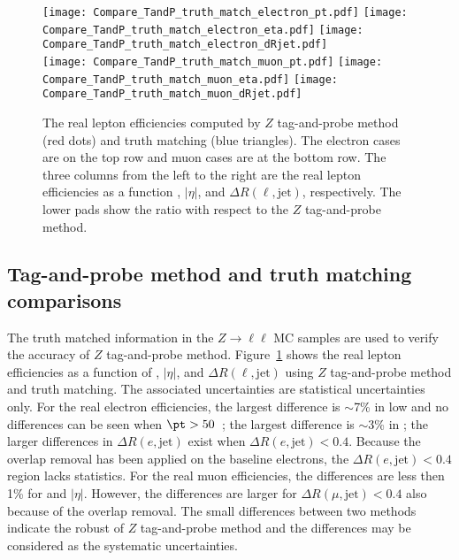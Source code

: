 \begin{figure}[htb]
    \texttt{[image: Compare\_TandP\_truth\_match\_electron\_pt.pdf]}
    \texttt{[image: Compare\_TandP\_truth\_match\_electron\_eta.pdf]}
    \texttt{[image: Compare\_TandP\_truth\_match\_electron\_dRjet.pdf]}\\
    \texttt{[image: Compare\_TandP\_truth\_match\_muon\_pt.pdf]}
    \texttt{[image: Compare\_TandP\_truth\_match\_muon\_eta.pdf]}
    \texttt{[image: Compare\_TandP\_truth\_match\_muon\_dRjet.pdf]}
    \caption{The real lepton efficiencies computed by $Z$ tag-and-probe method (red dots) and truth matching (blue triangles).
    The electron cases are on the top row and muon cases are at the bottom row.
    The three columns from the left to the right are the real lepton efficiencies as a function \pt, $|\eta|$, and $\Delta R(\ell, \mathrm{jet})$, respectively.
    The lower pads show the ratio with respect to the $Z$ tag-and-probe method.}
    \label{fig:app_RLE_TandP_truth_match_comparisons}
\end{figure}

\subsection{Tag-and-probe method and truth matching comparisons}
\label{subsec:app_RLE_truth_matched}
The truth matched information in the $Z \to \ell \ell$ MC samples are used to verify the accuracy of $Z$ tag-and-probe method.
Figure~\ref{fig:app_RLE_TandP_truth_match_comparisons} shows the real lepton efficiencies as a function of \pt, $|\eta|$, and $\Delta R(\ell, \mathrm{jet})$ using $Z$ tag-and-probe method and truth matching.
The associated uncertainties are statistical uncertainties only.
For the real electron efficiencies, the largest difference is $\sim$7\% in low \pt and no differences can be seen when $\pt > 50$~{\GeV}; the largest difference is $\sim$3\% in ; the larger differences in $\Delta R(e, \mathrm{jet})$ exist when $\Delta R(e, \mathrm{jet}) < 0.4$.
Because the overlap removal has been applied on the baseline electrons, the $\Delta R(e, \mathrm{jet}) < 0.4$ region lacks statistics.
For the real muon efficiencies, the differences are less then 1\% for \pt and $|\eta|$.
However, the differences are larger for $\Delta R(\mu, \mathrm{jet}) < 0.4$ also because of the overlap removal.
The small differences between two methods indicate the robust of $Z$ tag-and-probe method and the differences may be considered as the systematic uncertainties.

